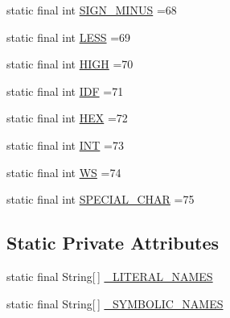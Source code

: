 \begin{DoxyCompactItemize}
\item 
static final int \hyperlink{classgov_1_1nasa_1_1jpf_1_1inspector_1_1client_1_1parser_1_1_console_grammar_lexer_a56e7b6593ae05550065c3f4386c38c22}{S\+I\+G\+N\+\_\+\+M\+I\+N\+US} =68
\item 
static final int \hyperlink{classgov_1_1nasa_1_1jpf_1_1inspector_1_1client_1_1parser_1_1_console_grammar_lexer_a311c01448cb06da192ca9349cfae884d}{L\+E\+SS} =69
\item 
static final int \hyperlink{classgov_1_1nasa_1_1jpf_1_1inspector_1_1client_1_1parser_1_1_console_grammar_lexer_a20ca6dd82a1a0840c895dee7adb78499}{H\+I\+GH} =70
\item 
static final int \hyperlink{classgov_1_1nasa_1_1jpf_1_1inspector_1_1client_1_1parser_1_1_console_grammar_lexer_a09f82c195f3db84bb722728da1045303}{I\+DF} =71
\item 
static final int \hyperlink{classgov_1_1nasa_1_1jpf_1_1inspector_1_1client_1_1parser_1_1_console_grammar_lexer_ab6ca6b19769943c974fb1ce75bbc44b9}{H\+EX} =72
\item 
static final int \hyperlink{classgov_1_1nasa_1_1jpf_1_1inspector_1_1client_1_1parser_1_1_console_grammar_lexer_a98f8d55de6944466e403975c51af55f2}{I\+NT} =73
\item 
static final int \hyperlink{classgov_1_1nasa_1_1jpf_1_1inspector_1_1client_1_1parser_1_1_console_grammar_lexer_aae0a260b14d39a83164da8aeae88f139}{WS} =74
\item 
static final int \hyperlink{classgov_1_1nasa_1_1jpf_1_1inspector_1_1client_1_1parser_1_1_console_grammar_lexer_a828ef5427aade14a4366c36bf813b1e3}{S\+P\+E\+C\+I\+A\+L\+\_\+\+C\+H\+AR} =75
\end{DoxyCompactItemize}
\subsection*{Static Private Attributes}
\begin{DoxyCompactItemize}
\item 
static final String\mbox{[}$\,$\mbox{]} \hyperlink{classgov_1_1nasa_1_1jpf_1_1inspector_1_1client_1_1parser_1_1_console_grammar_lexer_a8b778f8afc42ce4603bd9a45fc4a844f}{\+\_\+\+L\+I\+T\+E\+R\+A\+L\+\_\+\+N\+A\+M\+ES}
\item 
static final String\mbox{[}$\,$\mbox{]} \hyperlink{classgov_1_1nasa_1_1jpf_1_1inspector_1_1client_1_1parser_1_1_console_grammar_lexer_a72b8ae418b3a739b6bf1af10dd824798}{\+\_\+\+S\+Y\+M\+B\+O\+L\+I\+C\+\_\+\+N\+A\+M\+ES}
\end{DoxyCompactItemize}


